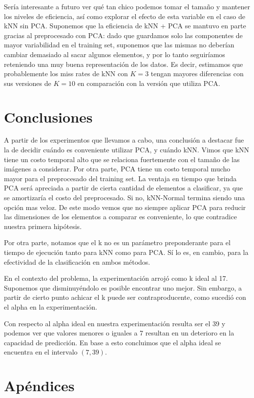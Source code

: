 \documentclass{article}
\begin{document}
Sería interesante a futuro ver qué tan chico podemos tomar el tamaño y mantener los niveles de eficiencia, así como explorar el efecto de esta variable en el caso de kNN sin PCA. Suponemos que la eficiencia de kNN + PCA se mantuvo en parte gracias al preprocesado con PCA: dado que guardamos solo las componentes de mayor variabilidad en el training set, suponemos que las mismas no deberían cambiar demasiado al sacar algunos elementos, y por lo tanto seguiríamos reteniendo una muy buena representación de los datos. Es decir, estimamos que probablemente los miss rates de kNN con $K=3$ tengan mayores diferencias con sus versiones de $K=10$ en comparación con la versión que utiliza PCA.

\section*{Conclusiones}

A partir de los experimentos que llevamos a cabo, una conclusión a destacar fue la de decidir cuándo es conveniente utilizar PCA, y cuándo kNN. Vimos que kNN tiene un costo temporal alto que se relaciona fuertemente con el tamaño de las imágenes a considerar. Por otra parte, PCA tiene un costo temporal mucho mayor para el preprocesado del training set. La ventaja en tiempo que brinda PCA será apreciada a partir de cierta cantidad de elementos a clasificar, ya que se amortizaría el costo del preprocesado. Si no, kNN-Normal termina siendo una opción mas veloz. De este modo vemos que no siempre aplicar PCA para reducir las dimensiones de los elementos a comparar es conveniente, lo que contradice nuestra primera hipótesis.

Por otra parte, notamos que el k no es un parámetro preponderante para el tiempo de ejecución tanto para kNN como para PCA. Sí lo es, en cambio, para la efectividad de la clasificación en ambos métodos.

En el contexto del problema, la experimentación arrojó como k ideal al 17. Suponemos que disminuyéndolo es posible encontrar uno mejor. Sin embargo, a partir de cierto punto achicar el k puede ser contraproducente, como sucedió con el alpha en la experimentación.

Con respecto al alpha ideal en nuestra experimentación resulta ser el 39 y podemos ver que valores menores o iguales a 7 resultan en un deterioro en la capacidad de predicción. En base a esto concluimos que el alpha ideal se encuentra en el intervalo $(7,39)$.    
\section{Apéndices}
\end{document}
